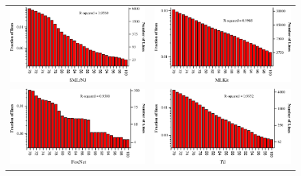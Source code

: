 \documentclass[12pt,abstracton]{scrartcl}
\begin{document}
\begin{figure}[bh!]
\centering
\begin{tabular}{cc}
\includegraphics[scale=0.68]{log-smlnj.eps} & \includegraphics[scale=0.68]{log-mlkit.eps} \\
\includegraphics[scale=0.68]{log-foxnet.eps} & \includegraphics[scale=0.68]{log-til.eps} \\

\end{tabular}
\end{figure}
\end{document}
